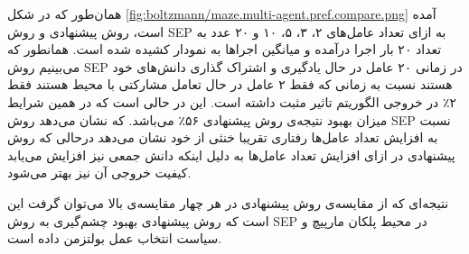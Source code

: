 همان‌طور که در شکل
\ref{fig:boltzmann/maze.multi-agent.pref.compare.png}
آمده است، روش پیشنهادی و روش SEP به ازای تعداد عامل‌های ۲، ۳، ۵، ۱۰ و ۲۰ عدد به تعداد ۲۰ بار اجرا درآمده و میانگین اجراها به نمودار کشیده شده است. همانطور که می‌بینیم روش SEP در زمانی ۲۰ عامل در حال یادگیری و اشتراک گذاری دانش‌های خود هستند نسبت به زمانی که فقط ۲ عامل در حال تعامل مشارکتی با محیط هستند فقط ۲٪ در خروجی الگوریتم تاثیر مثبت داشته است. این در حالی است که در همین شرایط میزان بهبود نتیجه‌ی روش پیشنهادی ۵۶٪ می‌باشد. که نشان می‌دهد روش SEP نسبت به افزایش تعداد عامل‌ها رفتاری تقریبا خنثی از خود نشان می‌دهد درحالی که روش پیشنهادی در ازای افزایش تعداد عامل‌ها به دلیل اینکه دانش جمعی نیز افزایش می‌یابد کیفیت خروجی آن نیز بهتر می‌شود.


 نتیجه‌ای که از مقایسه‌ی روش پیشنهادی در هر چهار مقایسه‌ی بالا می‌توان گرفت این است که روش پیشنهادی بهبود چشم‌گیری به روش SEP در محیط پلکان مارپیچ و سیاست انتخاب عمل بولتزمن داده است.